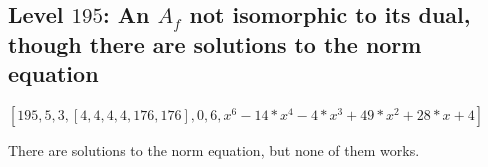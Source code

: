 \documentclass{article}
\begin{document}
\subsection{Level $195$: An $A_f$ not isomorphic to
its dual, though there are solutions to the norm equation}

$[195, 5, 3, [ 4, 4, 4, 4, 176, 176 ], 0, 6, x^6 - 14*x^4 - 4*x^3 + 49*x^2 +
28*x + 4] $

There are solutions to the norm equation, but none of them works.


\end{document}
